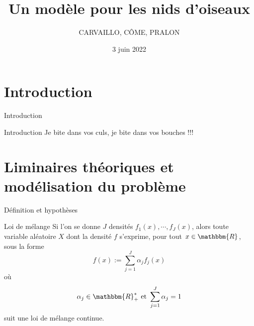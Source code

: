 \documentclass[11pt]{beamer}
\begin{document}
	\author{CARVAILLO, CÔME, PRALON}
	\title[Projet UE HAX817X]{Un modèle pour les nids d'oiseaux}
	\subtitle{}
	\date{3 juin 2022}
	\frame{\titlepage}
	
	\section{Introduction}
	
	\begin{frame}{Introduction}
		\begin{block}{Introduction}
			Je bite dans vos culs, je bite dans vos bouches !!!
		\end{block}
	\end{frame}
	
	\section{Liminaires théoriques et modélisation du problème}
	
	\begin{frame}{Définition et hypothèses}
		\begin{block}{Loi de mélange}
			Si l'on se donne $J$  densités $f_1(x), \cdots, f_J(x)$, alors toute variable aléatoire $X$ dont la densité $f$ s'exprime, pour tout $x\in\mathbbm{R}$, sous la forme
			\[
			f(x) := \displaystyle\sum_{j=1}^J \alpha_j f_j(x)
			\]
			où
			\[
			\alpha_j \in\mathbbm{R}_+^* \text{ et } \displaystyle\sum_{j=1}^J\alpha_j=1
			\]
			suit une loi de mélange continue.
		\end{block}
	\end{frame}
	
\end{document}
